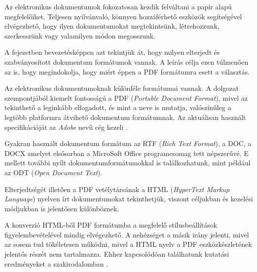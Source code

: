 
Az elektronikus dokumentumok fokozatosan kezdik felváltani a papír alapú megfelelőiket.
Teljesen nyilvánvaló, könnyen hozzáférhető eszközök segítségével elvégezhető, hogy ilyen dokumentumokat megtekintsünk, létrehozzunk, szerkesszünk vagy valamilyen módon megosszunk.

A fejezetben bevezetésképpen azt tekintjük át, hogy milyen elterjedt és szabványosított dokumentum formátumok vannak.
A leírás célja ezen túlmenően az is, hogy megindokolja, hogy miért éppen a PDF formátumra esett a választás.


Az elektronikus dokumentumoknak különféle formátumai vannak.
A dolgozat szempontjából kiemelt fontosságú a PDF (\textit{Portable Document Format}), mivel az tekinthető a leginkább elfogadott, és mint a neve is mutatja, valószínűleg a legtöbb platformra átvihető dokumentum formátumnak.
Az aktuálisan használt specifikációját az \textit{Adobe} nevű cég kezeli \cite{pdf}.

Gyakran használt dokumentum formátum az RTF (\textit{Rich Text Format}), a DOC, a DOCX amelyet elsősorban a MicroSoft Office programcsomag tett népszerűvé. E mellett további nyílt dokumentumformátumokkal is találkozhatunk, mint például az ODT (\textit{Open Document Text}).

Elterjedtségét illetően a PDF vetélytársának a HTML (\textit{HyperText Markup Language}) nyelven írt dokumentumokat tekinthetjük, viszont céljukban és kezelési módjukban is jelentősen különböznek.

A konverzió HTML-ből PDF formátumba a megfelelő stílusbeállítások figyelembevételével mindig elvégezhető. A nehézséget a másik irány jelenti, mivel az sosem tud tökéletesen működni, mivel a HTML nyelv a PDF eszközkészletének jelentős részét nem tartalmazza.
Ehhez kapcsolódóan találhatunk kutatási eredményeket a szakirodalomban \cite{jiang2009converting}.

